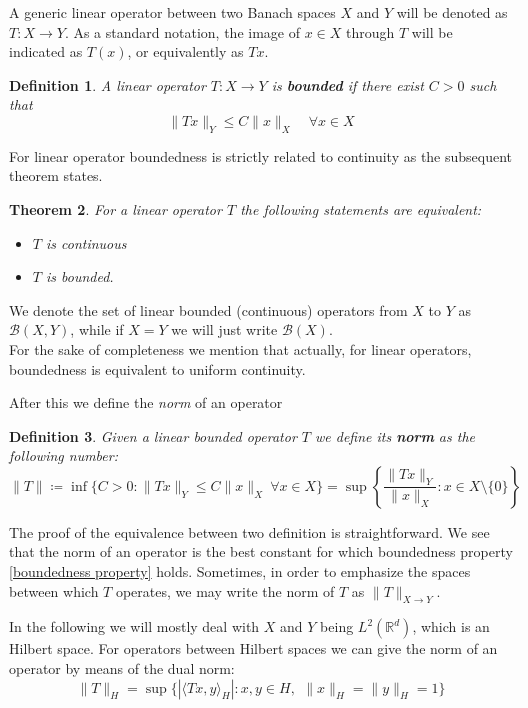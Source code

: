 \documentclass[corpo=11pt, stile=classica, tipotesi=custom,
greek, evenboxes, english]{toptesi}
\numberwithin{equation}{chapter}
\newtheorem{teo}{Theorem}[chapter] %
\newtheorem{defi}[teo]{Definition}
\theoremstyle{remark}
\newcommand{\R}{\mathbb{R}} %
\newcommand{\B}{\mathscr{B}} %
\begin{document}
A generic linear operator between two Banach spaces $X$ and $Y$ will be denoted as $T : X \rightarrow Y$. As a standard notation, the image of $x \in X$ through $T$ will be indicated as $T(x)$, or equivalently as $Tx$.
\begin{defi}\label{bounded operator}
	A linear operator $T : X \rightarrow Y$ is \textbf{bounded} if there exist $C>0$ such that
	\begin{equation}\label{boundedness property}
		\| Tx \|_Y \leq C \| x \|_X \quad \forall x \in X
	\end{equation}
\end{defi}
For linear operator boundedness is strictly related to continuity as the subsequent theorem states.
\begin{teo}\label{equivalente boundedness continuity}
	For a linear operator $T$ the following statements are equivalent:
	\begin{itemize}
		\item $T$ is continuous
		\item $T$ is bounded.
	\end{itemize}
\end{teo}
We denote the set of linear bounded (continuous) operators from $X$ to $Y$ as $\B(X,Y)$, while if $X=Y$ we will just write $\B(X)$.\\
For the sake of completeness we mention that actually, for linear operators, boundedness is equivalent to uniform continuity.

After this we define the \emph{norm} of an operator
\begin{defi}\label{norm operator}
	Given a linear bounded operator $T$ we define its \textbf{norm} as the following number:
	\begin{equation*}
		\|T\| \coloneqq \inf\{C>0 : \| Tx \|_Y \leq C \| x \|_X \  \forall x \in X\} = \sup \left\{ \dfrac{\| Tx \|_Y}{\| x \|_X} : x \in X \setminus \{0\}\right\}
	\end{equation*}
\end{defi}
The proof of the equivalence between two definition is straightforward. We see that the norm of an operator is the best constant for which boundedness property \eqref{boundedness property} holds. {\color{blue} Sometimes, in order to emphasize the spaces between which $T$ operates, we may write the norm of $T$ as $\| T \|_{X \rightarrow Y}$.}

In the following we will mostly deal with $X$ and $Y$ being $L^2(\R^d)$, which is an Hilbert space. For operators between Hilbert spaces we can give the norm of an operator by means of the dual norm:
\begin{equation*}
	\| T \|_H = \sup\{|\langle Tx, y \rangle_H| : x,y \in H,\,\ \|x\|_H = \|y\|_H = 1 \}
\end{equation*}
\end{document}
